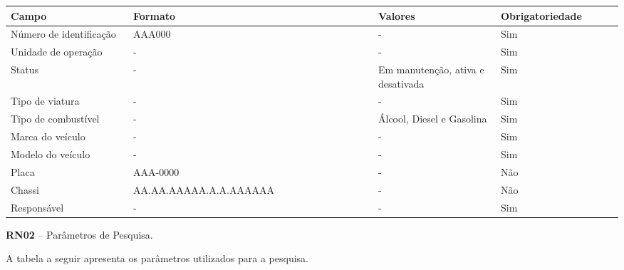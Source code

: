    \begin{table*}[!h]
    \centering
      \begin{tabular}{|p{0.20\linewidth}|p{0.4\linewidth}|p{0.20\linewidth}|p{0.20\linewidth}|}
      \hline
      Campo  & Formato & Valores & Obrigatoriedade\\
      \hline

        Número de identificação & AAA000 & - & Sim\\

  \hline                               
  Unidade de operação & - & - & Sim\\

  \hline                               
  Status & - & Em manutenção, ativa e desativada & Sim\\
  
  \hline                               
  Tipo de viatura & - & - & Sim\\
  
  \hline                               
  Tipo de combustível & - & Álcool, Diesel e Gasolina & Sim\\
  
  \hline                               
  Marca do veículo & - & - & Sim\\
  
  \hline                               
  Modelo do veículo & - & - & Sim\\
  
  \hline                               
  Placa & AAA-0000 & - & Não\\
  
  \hline                               
  Chassi & AA.AA.AAAAA.A.A.AAAAAA & - & Não\\
  
  \hline                               
  Responsável & - & - & Sim\\  
  
  \hline  
      
      \end{tabular}
    \end{table*}

  \vfill
  \pagebreak
    
      \textbf{RN02} – Parâmetros de Pesquisa.
   
A tabela a seguir apresenta os parâmetros utilizados para a pesquisa.

